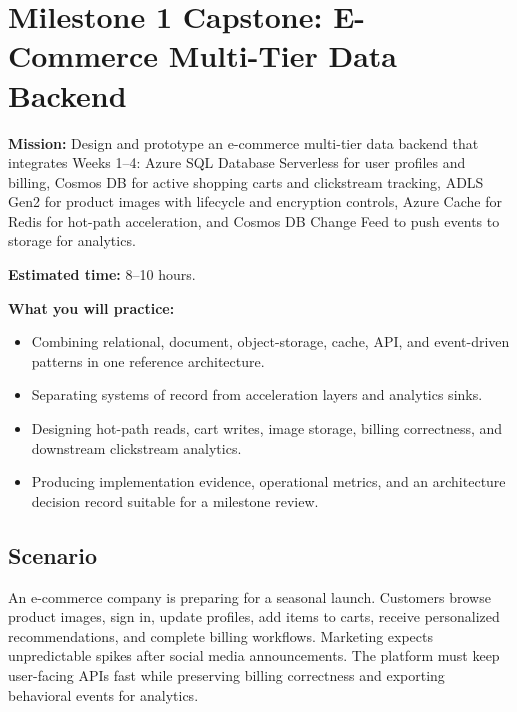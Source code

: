 \section{Milestone 1 Capstone: E-Commerce Multi-Tier Data Backend}\label{sec:ch4-capstone}

\begin{capstonebox}
\textbf{Mission:} Design and prototype an e-commerce multi-tier data backend that integrates Weeks 1--4: Azure SQL Database Serverless for user profiles and billing, Cosmos DB for active shopping carts and clickstream tracking, ADLS Gen2 for product images with lifecycle and encryption controls, Azure Cache for Redis for hot-path acceleration, and Cosmos DB Change Feed to push events to storage for analytics.

\textbf{Estimated time:} 8--10 hours.

\textbf{What you will practice:}
\begin{itemize}
    \item Combining relational, document, object-storage, cache, API, and event-driven patterns in one reference architecture.
    \item Separating systems of record from acceleration layers and analytics sinks.
    \item Designing hot-path reads, cart writes, image storage, billing correctness, and downstream clickstream analytics.
    \item Producing implementation evidence, operational metrics, and an architecture decision record suitable for a milestone review.
\end{itemize}
\end{capstonebox}

\subsection*{Scenario}
An e-commerce company is preparing for a seasonal launch. Customers browse product images, sign in, update profiles, add items to carts, receive personalized recommendations, and complete billing workflows. Marketing expects unpredictable spikes after social media announcements. The platform must keep user-facing APIs fast while preserving billing correctness and exporting behavioral events for analytics.

